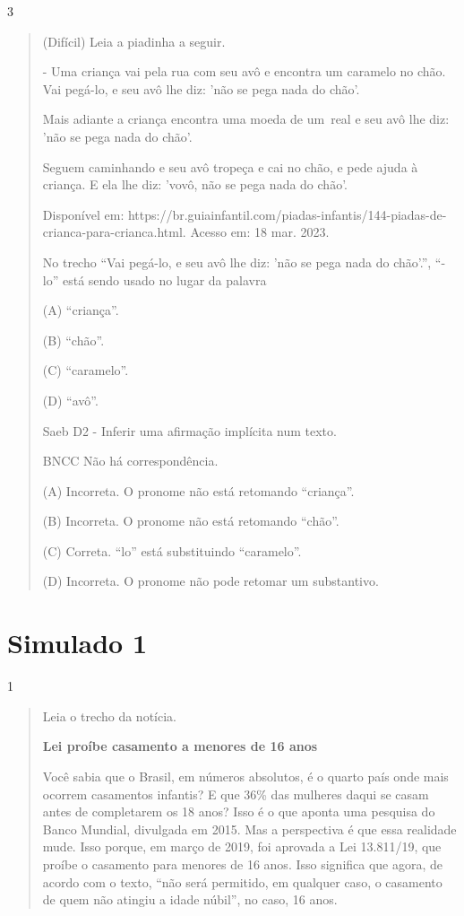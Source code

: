 \begin{itemize}
{{{\begin{itemize}
\begin{itemize}
\begin{itemize}
\num{3}

\begin{quote}
(Difícil) Leia a piadinha a seguir.

- Uma criança vai pela rua com seu avô e encontra um caramelo no chão.
Vai pegá-lo, e seu avô lhe diz: 'não se pega nada do chão'.

Mais adiante a criança encontra uma moeda de um~real e seu avô lhe diz:
'não se pega nada do chão'.~

Seguem caminhando e seu avô tropeça e cai no chão, e pede ajuda à
criança. E ela lhe diz: 'vovô, não se pega nada do chão'.

Disponível em:
https://br.guiainfantil.com/piadas-infantis/144-piadas-de-crianca-para-crianca.html.
Acesso em: 18 mar. 2023.

No trecho ``Vai pegá-lo, e seu avô lhe diz: 'não se pega nada do
chão'.'', ``-lo'' está sendo usado no lugar da palavra

(A) ``criança''.

(B) ``chão''.

(C) ``caramelo''.

(D) ``avô''.

Saeb D2 - Inferir uma afirmação implícita num texto.

BNCC Não há correspondência.

(A) Incorreta. O pronome não está retomando ``criança''.

(B) Incorreta. O pronome não está retomando ``chão''.

(C) Correta. ``lo'' está substituindo ``caramelo''.

(D) Incorreta. O pronome não pode retomar um substantivo.
\end{quote}

\chapter{Simulado 1}

\num{1}

\begin{quote}
Leia o trecho da notícia.

\textbf{Lei proíbe casamento a menores de 16 anos}

Você sabia que o Brasil, em números absolutos, é o quarto país onde mais
ocorrem casamentos infantis? E que 36\% das mulheres daqui se casam
antes de completarem os 18 anos? Isso é o que aponta uma pesquisa do
Banco Mundial, divulgada em 2015. Mas a perspectiva é que essa realidade
mude. Isso porque, em março de 2019, foi aprovada a Lei 13.811/19, que
proíbe o casamento para menores de 16 anos. Isso significa que agora, de
acordo com o texto, ``não será permitido, em qualquer caso, o casamento
de quem não atingiu a idade núbil'', no caso, 16 anos.


\end{quote}
\end{itemize}
\end{itemize}
\end{itemize}}}}
\end{itemize}
